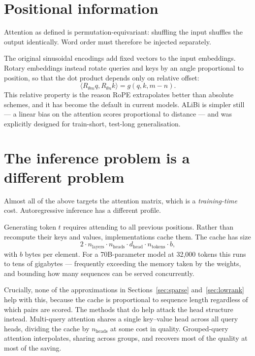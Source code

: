 \documentclass[11pt,a4paper]{article}
\begin{document}
\section{Positional information}
\label{sec:positional}

Attention as defined is permutation-equivariant: shuffling the input shuffles
the output identically. Word order must therefore be injected separately.

The original sinusoidal encodings \cite{vaswani2017} add fixed vectors to the
input embeddings. Rotary embeddings \cite{su2021} instead rotate queries and
keys by an angle proportional to position, so that the dot product depends
only on relative offset:
\begin{equation}
  \langle R_{\theta m} q, R_{\theta n} k \rangle = g(q, k, m - n).
\end{equation}
This relative property is the reason RoPE extrapolates better than absolute
schemes, and it has become the default in current models. ALiBi
\cite{press2022} is simpler still --- a linear bias on the attention scores
proportional to distance --- and was explicitly designed for train-short,
test-long generalisation.

\section{The inference problem is a different problem}
\label{sec:inference}

Almost all of the above targets the attention matrix, which is a
\emph{training-time} cost. Autoregressive inference has a different profile.

Generating token $t$ requires attending to all previous positions. Rather than
recompute their keys and values, implementations cache them. The cache has
size
\begin{equation}
  2 \cdot n_{\text{layers}} \cdot n_{\text{heads}} \cdot d_{\text{head}}
  \cdot n_{\text{tokens}} \cdot b,
\end{equation}
with $b$ bytes per element. For a 70B-parameter model at 32{,}000 tokens this
runs to tens of gigabytes --- frequently exceeding the memory taken by the
weights, and bounding how many sequences can be served concurrently.

Crucially, none of the approximations in Sections~\ref{sec:sparse}
and~\ref{sec:lowrank} help with this, because the cache is proportional to
sequence length regardless of which pairs are scored. The methods that do help
attack the head structure instead. Multi-query attention \cite{shazeer2019}
shares a single key--value head across all query heads, dividing the cache by
$n_{\text{heads}}$ at some cost in quality. Grouped-query attention
\cite{ainslie2023} interpolates, sharing across groups, and recovers most of
the quality at most of the saving.
\end{document}
